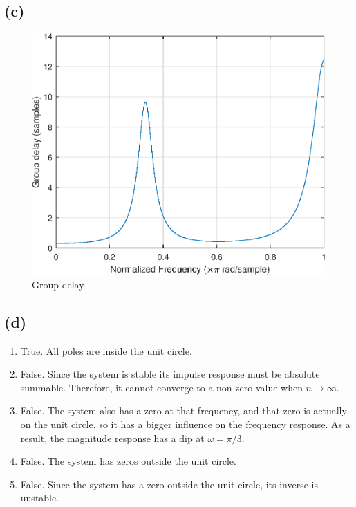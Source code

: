 \documentclass{article}
\begin{document}
\subsection{(c)}

\FloatBarrier
\begin{figure}[h!]
	\centering
	\includegraphics[scale=0.7]{figs/hw4q1b_grpdelay.eps}
	\caption{Group delay}
\end{figure}
\FloatBarrier

\subsection{(d)}

\begin{enumerate}
	\item True. All poles are inside the unit circle.
	\item False. Since the system is stable its impulse response must be absolute summable. Therefore, it cannot converge to a non-zero value when $n\to\infty$.
	\item False. The system also has a zero at that frequency, and that zero is actually on the unit circle, so it has a bigger influence on the frequency response. As a result, the magnitude response has a dip at $\omega = \pi/3$.
	\item False. The system has zeros outside the unit circle.
	\item False. Since the system has a zero outside the unit circle, its inverse is unstable.

\end{enumerate}
\end{document}
